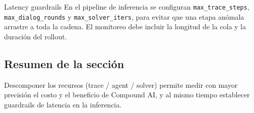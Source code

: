 \begin{knowledgebox}{Latency guardrails}
En el pipeline de inferencia se configuran \texttt{max\_trace\_steps}, \texttt{max\_dialog\_rounds} y \texttt{max\_solver\_iters}, para evitar que una etapa anómala arrastre a toda la cadena. El monitoreo debe incluir la longitud de la cola y la duración del rollout.
\end{knowledgebox}

\subsection{Resumen de la sección}

Descomponer los recursos (trace / agent / solver) permite medir con mayor precisión el costo y el beneficio de Compound AI, y al mismo tiempo establecer guardrails de latencia en la inferencia.

